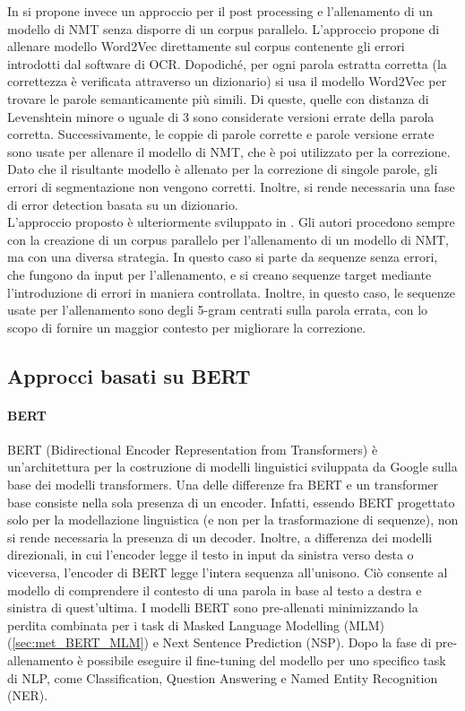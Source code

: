 In \cite{hamalainen2019paft} si propone invece un approccio per il post processing e l'allenamento di un modello di NMT senza disporre di un corpus parallelo. L'approccio propone di allenare modello Word2Vec direttamente sul corpus contenente gli errori introdotti dal software di OCR. Dopodiché, per ogni parola estratta corretta (la correttezza è verificata attraverso un dizionario) si usa il modello Word2Vec per trovare le parole semanticamente più simili. Di queste, quelle con distanza di Levenshtein minore o uguale di 3 sono considerate versioni errate della parola corretta. Successivamente, le coppie di parole corrette e parole versione errate sono usate per allenare il modello di NMT, che è poi utilizzato per la correzione. Dato che il risultante modello è allenato per la correzione di singole parole, gli errori di segmentazione non vengono corretti. Inoltre, si rende necessaria una fase di error detection basata su un dizionario. \\
L'approccio proposto è ulteriormente sviluppato in \cite{duong2020unsupervised}. Gli autori procedono sempre con la creazione di un corpus parallelo per l'allenamento di un modello di NMT, ma con una diversa strategia. In questo caso si parte da sequenze senza errori, che fungono da input per l'allenamento, e si creano sequenze target mediante l'introduzione di errori in maniera controllata. Inoltre, in questo caso, le sequenze usate per l'allenamento sono degli 5-gram centrati sulla parola errata, con lo scopo di fornire un maggior contesto per migliorare la correzione.


\subsection{Approcci basati su BERT}
\label{sec:art_bert}
\paragraph{BERT}
BERT\cite{devlin2018bert} (Bidirectional Encoder Representation from Transformers) è un'architettura per la costruzione di modelli linguistici sviluppata da Google sulla base dei modelli transformers. Una delle differenze fra BERT e un transformer base consiste nella sola presenza di un encoder. Infatti, essendo BERT progettato solo per la modellazione linguistica (e non per la trasformazione di sequenze), non si rende necessaria la presenza di un decoder. Inoltre, a differenza dei modelli direzionali, in cui l'encoder legge il testo in input da sinistra verso desta o viceversa, l'encoder di BERT legge l'intera sequenza all'unisono. Ciò consente al modello di comprendere il contesto di una parola in base al testo a destra e sinistra di quest'ultima. I modelli BERT sono pre-allenati minimizzando la perdita combinata per i task di Masked Language Modelling (MLM) (\autoref{sec:met_BERT_MLM}) e Next Sentence Prediction (NSP). Dopo la fase di pre-allenamento è possibile eseguire il fine-tuning del modello per uno specifico task di NLP, come Classification, Question Answering e Named Entity Recognition (NER).

